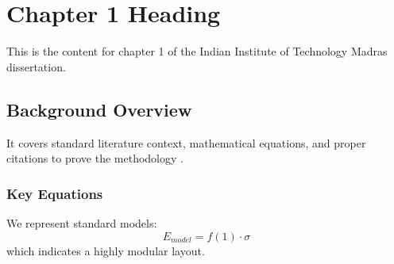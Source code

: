 \chapter{Chapter 1 Heading}
\label{ch:chapter1}
This is the content for chapter 1 of the Indian Institute of Technology Madras dissertation.

\section{Background Overview}
It covers standard literature context, mathematical equations, and proper citations to prove the methodology \cite{texbook}.

\subsection{Key Equations}
We represent standard models:
\begin{equation}
    E_{model} = f(1) \cdot \sigma
\end{equation}
which indicates a highly modular layout.
